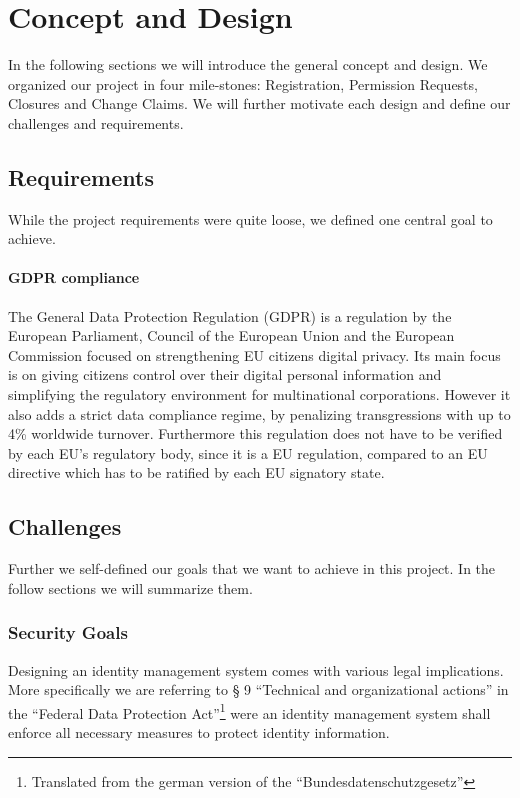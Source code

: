 
\chapter{Concept and Design}
\label{cha:conceptanddesign}
In the following sections we will introduce the general concept and design. We organized our project in four mile-stones: Registration, Permission Requests, Closures and Change Claims. 
We will further motivate each design and define our challenges and requirements.

\section{Requirements}

While the project requirements were quite loose, we defined one central goal to achieve.

\subsubsection{GDPR compliance}
\label{subsubsec:GDPR_compliance}
The General Data Protection Regulation (GDPR) is a regulation by the European Parliament, Council of the European Union and the European Commission focused on strengthening EU citizens digital privacy.  Its main focus is on giving citizens control over their digital personal information and simplifying the regulatory environment for multinational corporations. However it also adds a strict data compliance regime, by penalizing transgressions with up to 4\% worldwide turnover\cite{gdpr}. Furthermore this regulation does not have to be verified by each EU's regulatory body, since it is a EU regulation, compared to an EU directive which has to be ratified by each EU signatory state.

\section{Challenges}
\label{sec:challenges}

Further we self-defined our goals that we want to achieve in this project. In the follow sections we will summarize them.

\subsection{Security Goals}
\label{sec:securityGoals}

Designing an identity management system comes with various legal implications. More specifically we are referring to § 9 “Technical and organizational actions” in the “Federal Data Protection Act”\footnote{Translated from the german version of the  “Bundesdatenschutzgesetz”} were an identity management system shall enforce all necessary measures to protect identity information.\cite{bdsg}

